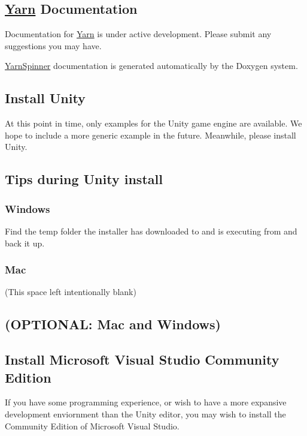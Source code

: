 \subsection*{\hyperlink{a00031}{Yarn} Documentation}

Documentation for \hyperlink{a00031}{Yarn} is under active development. Please submit any suggestions you may have.

\hyperlink{a00313}{Yarn\-Spinner} documentation is generated automatically by the Doxygen system.

\subsection*{Install Unity}

At this point in time, only examples for the Unity game engine are available. We hope to include a more generic example in the future. Meanwhile, please install Unity.

\subsection*{Tips during Unity install}

\subsubsection*{Windows}

Find the temp folder the installer has downloaded to and is executing from and back it up.

\subsubsection*{Mac}

(This space left intentionally blank)

\subsection*{(O\-P\-T\-I\-O\-N\-A\-L\-: Mac and Windows)}

\subsection*{Install Microsoft Visual Studio Community Edition}

If you have some programming experience, or wish to have a more expansive development enviornment than the Unity editor, you may wish to install the Community Edition of Microsoft Visual Studio. 